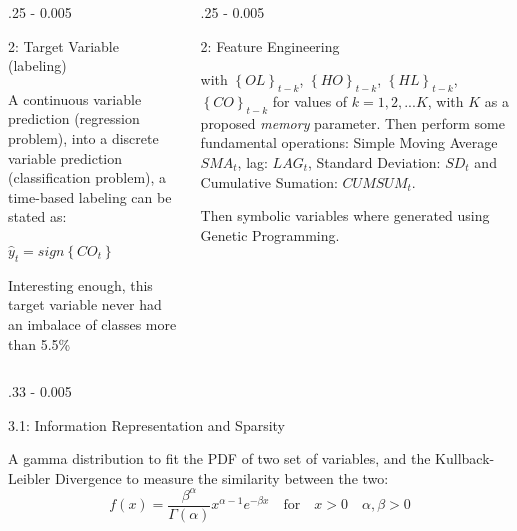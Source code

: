 \documentclass{postertheme}\usepackage[]{graphicx}\usepackage[]{color}
\begin{document}
\begin{frame}
\begin{columns}[onlytextwidth]
  \begin{column}{.25 \textwidth - 0.005 \textwidth}
    \begin{block}{2: Target Variable (labeling)} \footnotesize
    
    A continuous variable prediction (regression problem), into
    a discrete variable prediction (classification problem), a time-based labeling can be stated as:
      
      $\hat{y}_{t} = sign \left\{ CO_{t} \right\}$
      
      Interesting enough, this target variable never had an imbalace of classes more than 5.5\%

    \end{block}
  \end{column}

  \begin{column}{.25 \textwidth - 0.005 \textwidth}
    \begin{block}{2: Feature Engineering} \footnotesize

     with $\left\{ OL \right\}_{t-k}$, $\left\{ HO \right\}_{t-k}$, $\left\{ HL \right\}_{t-k}$,
      $\left\{ CO \right\}_{t-k}$ for values of $k = 1, 2, ... K$, with $K$ as a proposed 
      \textit{memory} parameter. Then perform some fundamental operations: Simple Moving Average $SMA_{t}$,
      lag: $LAG_{t}$, Standard Deviation: $SD_t$ and Cumulative Sumation: $CUMSUM_{t}$.
      
      Then symbolic variables where generated using Genetic Programming.

    \end{block}
  \end{column}
  
\end{columns}


\begin{columns}[onlytextwidth]
  
  \begin{column}{.33 \textwidth - 0.005 \textwidth}
    \begin{block}{3.1: Information Representation and Sparsity}
    
    \footnotesize
    A gamma distribution to fit the PDF of two set of variables, and the Kullback-Leibler Divergence to measure 
    the similarity between the two:
    \begin{equation}
      f(x) = \frac{\beta^{\alpha}}{\Gamma(\alpha)} x^{\alpha - 1}e^{-\beta x} \quad \text{for}
      \quad x > 0 \quad \alpha,\beta >0 
    \end{equation}
    

\end{block}
\end{column}
\end{columns}
\end{frame}
\end{document}
